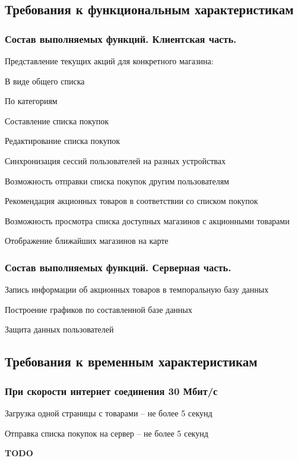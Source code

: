 \subsection{Требования к функциональным характеристикам}

\subsubsection{Состав выполняемых функций. Клиентская часть.}
\begin{my_enumerate}
\item Представление текущих акций для конкретного магазина:
    \begin{my_enumerate}
    \item В виде общего списка
    \item По категориям
    \end{my_enumerate}
\item Составление списка покупок
\item Редактирование списка покупок
\item Синхронизация сессий пользователей на разных устройствах
\item Возможность отправки списка покупок другим пользователям
\item Рекомендация акционных товаров в соответствии со списком покупок
\item Возможность просмотра списка доступных магазинов с акционными товарами
\item Отображение ближайших магазинов на карте
\end{my_enumerate}

\subsubsection{Состав выполняемых функций. Серверная часть.}
\begin{my_enumerate}
\item Запись информации об акционных товаров в темпоральную базу данных
\item Построение графиков по составленной базе данных
\item Защита данных пользователей
\end{my_enumerate}

\subsection{Требования к временным характеристикам}

\subsubsection{При скорости интернет соединения 30 Мбит/с}
\begin{my_enumerate}
\item Загрузка одной страницы с товарами -- не более 5 секунд
\item Отправка списка покупок на сервер -- не более 5 секунд
\item \textbf{TODO}
\end{my_enumerate}


